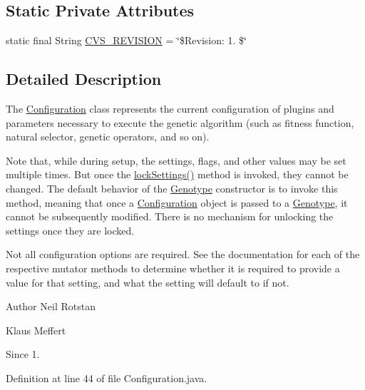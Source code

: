 \subsection*{Static Private Attributes}
\begin{DoxyCompactItemize}
\item 
static final String \hyperlink{classorg_1_1jgap_1_1_configuration_a0bcf247e3c46ee130429eeb2520d0941}{C\-V\-S\-\_\-\-R\-E\-V\-I\-S\-I\-O\-N} = \char`\"{}\$Revision\-: 1. \$\char`\"{}
\end{DoxyCompactItemize}


\subsection{Detailed Description}
The \hyperlink{classorg_1_1jgap_1_1_configuration}{Configuration} class represents the current configuration of plugins and parameters necessary to execute the genetic algorithm (such as fitness function, natural selector, genetic operators, and so on). 

Note that, while during setup, the settings, flags, and other values may be set multiple times. But once the \hyperlink{classorg_1_1jgap_1_1_configuration_a7613143675140e68fc9a09dacfa41e1a}{lock\-Settings()} method is invoked, they cannot be changed. The default behavior of the \hyperlink{classorg_1_1jgap_1_1_genotype}{Genotype} constructor is to invoke this method, meaning that once a \hyperlink{classorg_1_1jgap_1_1_configuration}{Configuration} object is passed to a \hyperlink{classorg_1_1jgap_1_1_genotype}{Genotype}, it cannot be subsequently modified. There is no mechanism for unlocking the settings once they are locked. 

Not all configuration options are required. See the documentation for each of the respective mutator methods to determine whether it is required to provide a value for that setting, and what the setting will default to if not.

\begin{DoxyAuthor}{Author}
Neil Rotstan 

Klaus Meffert 
\end{DoxyAuthor}
\begin{DoxySince}{Since}
1. 
\end{DoxySince}


Definition at line 44 of file Configuration.\-java.




